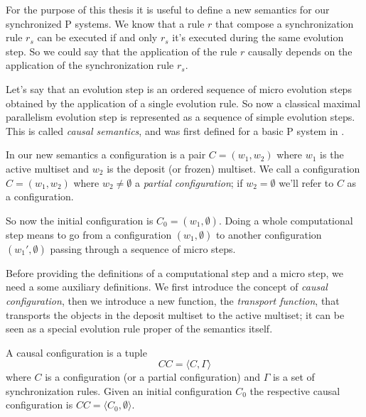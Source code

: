 For the purpose of this thesis it is useful to define a new semantics for our synchronized P systems.
We know that a rule $r$ that compose a synchronization rule $r_s$ can be executed if and only $r_s$ it's executed during the same evolution step. 
So we could say that the application of the rule $r$ causally depends on the application of the synchronization rule $r_s$.\newline

Let's say that an evolution step is an ordered sequence of micro evolution steps obtained by the application of a single evolution rule.
So now a classical maximal parallelism evolution step is represented as a sequence of simple evolution steps.
This is called \textit{causal semantics}, and was first defined for a basic P system in \cite{busi2007causality}.

\begin{definition}
    In our new semantics a configuration is a pair $C=(w_1,w_2)$ where $w_1$ is the active multiset and $w_2$ is the deposit (or frozen) multiset.\newline
    We call a configuration $C=(w_1,w_2)$ where $w_2 \neq \emptyset$ a \textit{partial configuration}; if $w_2 = \emptyset$ we'll refer to $C$ as a configuration.
\end{definition}

So now the initial configuration is $C_0=(w_1,\emptyset)$.
Doing a whole computational step means to go from a configuration $(w_1,\emptyset)$ to another configuration $(w_1',\emptyset)$ passing through a sequence of micro steps.

Before providing the definitions of a computational step and a micro step, we need a some auxiliary definitions.
We first introduce the concept of \textit{causal configuration}, then we introduce a new function, the \textit{transport function}, that transports the objects in the deposit multiset to the active multiset; it can be seen as a special evolution rule proper of the semantics itself.

\begin{definition}
    A causal configuration is a tuple 
    \[CC = \langle C, \Gamma \rangle\]
    where $C$ is a configuration (or a partial configuration) and $\Gamma$ is a set of synchronization rules.
    Given an initial configuration $C_0$ the respective causal configuration is $CC = \langle C_0,\emptyset\rangle$.
\end{definition}

